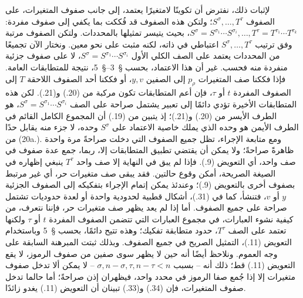 \documentclass[11pt]{article}
\begin{document}
لإثبات ذلك، نفترض أن تكوينًا لامتغيرًا يعتمد، إلى جانب صفوف المتغيرات، على الصفوف $S^\sigma,\ldots,T^\tau$؛ ولتكن هذه الصفوف قد فُككت بما يكفي إلى صفوف مفردة: $S^\sigma=S^{\sigma_1}\cdots S^{\sigma_i},\ldots,T^\tau=T^{\tau_1}\cdots T^{\tau_k}$، بحيث يتيسر تمثيلها بالمحددات. ولتكن الصفوف مرتبة وفق ترتيب $S^\sigma,\ldots,T^\tau$ اعتباطي في ذاته، لكنه مثبت على نحو معين. ونختار الآن تجميعًا من المحددات يعتمد على الصف الكلي الأول $S^\sigma=S^{\sigma_1}\cdots S^{\sigma_i}$، لا على صفوف جزئية منفردة منه فحسب. غير أن هذا الاعتماد، بحسب \S\ 3--\S\ 5، نتيجة للمتطابقات العامة. فإذا فككنا صف المتغيرات $p_\rho$ إلى الصفين $y,v$، أو فككنا أحد الصفوف اللاحقة $T$ إلى الصفوف المفردة $t$ أو $\tau$، فإن أعم المتطابقات تكون مركبة من (20.) و(21.). لكن هذه المتطابقات الأخيرة تؤدي دائمًا إلى تعبير يشتمل صراحة على الصف $S^\sigma=S^{\sigma_1}\cdots S^{\sigma_i}$، هو الطرف الأيسر من (20.) و(21.)؛ إذ يتبين من (19.) أن المجموع الكامل القائم في الطرف الأيمن هو وحده الذي يملك خاصية الاعتماد على $S^\sigma$ وحده، لا جزء منه يقابل حدًا من (20a.). ومع متابعة الإجراء، تظل جميع الصفوف التي دخلت صراحةً مرة واحدة ظاهرةً صراحةً؛ ولا يمكن أن يقتضي تطبيق المتطابقات إلا، ربما، جمع عدة صفوف في صف واحد، أي التعويض (9.). فإذا لم يبق في النهاية إلا صف واحد $T^\tau$ ينبغي إظهاره في الصيغة الصريحة، أمكن وقوع حالتين. فقد يبقى صف متغيرات حر، أي غير مرتبط بصفوف أخرى بالتعويض (9.)؛ وعندئذ يمكن إتمام الإجراء بتفكيكه إلى الصفوف الجزئية $y$ أو $v$، فتنشأ، كما في (31.)، أشكال قطبية لحدودية واحدة أو لعدة حدوديات تشتمل صراحة على جميع الصفوف. أما إذا لم يعد يظهر صف متغيرات حر، فإننا نتعرف، من كيفية نشوء العبارات، في مجموع العبارات التي تتضمن الصفوف المفردة $t$ أو $\tau$ ولكنها تعتمد على الصف $T^\tau$، حدود متطابقة تفكيك؛ وهذه تتيح دائمًا، بحسب \S\ 5 وباستخدام التعويض (11.)، التمثيل الصريح في جميع الصفوف. وبذلك ثبتت المبرهنة السابقة على وجه العموم. ونلاحظ أيضًا أنه حين لا يظهر سوى صفين من صفوف الرموز، لا يقع التعويض (11.) قط؛ ذلك أنه -- بسبب $\sigma,n-\sigma,\tau,n-\tau<n$ -- لا يمكن ألا تدخل صفوف متغيرات إلا إذا جُمع صفا الرموز في محدد واحد، فيظهران إذن صراحةً؛ أما حالما تدخل صفوف المتغيرات، فإن (34.) و(33.) تبينان أن التعويض (11.) يغدو زائدًا.
\end{document}
